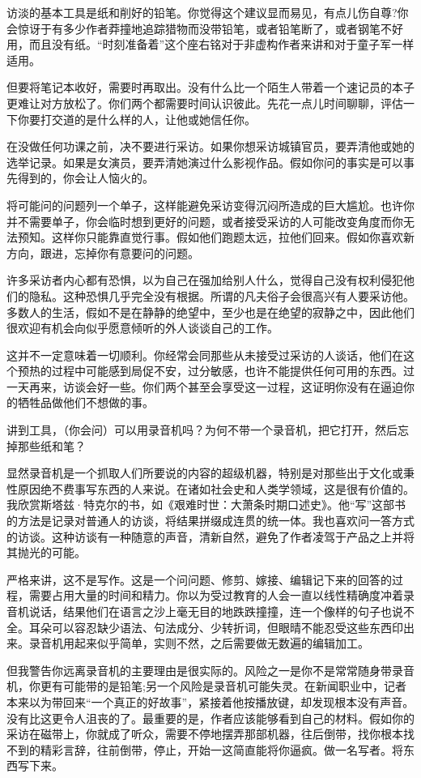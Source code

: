 访淡的基本工具是纸和削好的铅笔。你觉得这个建议显而易见，有点儿伤自尊?你会惊讶于有多少作者莽撞地追踪猎物而没带铅笔，或者铅笔断了，或者钢笔不好用，而且没有纸。“时刻准备着”这个座右铭对于非虚构作者来讲和对于童子军一样适用。

但要将笔记本收好，需要时再取出。没有什么比一个陌生人带着一个速记员的本子更难让对方放松了。你们两个都需要时间认识彼此。先花一点儿时间聊聊，评估一下你要打交道的是什么样的人，让他或她信任你。

在没做任何功课之前，决不要进行采访。如果你想采访城镇官员，要弄清他或她的选举记录。如果是女演员，要弄清她演过什么影视作品。假如你问的事实是可以事先得到的，你会让人恼火的。

将可能问的问题列一个单子，这样能避免采访变得沉闷所造成的巨大尴尬。也许你并不需要单子，你会临时想到更好的问题，或者接受采访的人可能改变角度而你无法预知。这样你只能靠直觉行事。假如他们跑题太远，拉他们回来。假如你喜欢新方向，跟进，忘掉你有意要问的问题。

许多采访者内心都有恐惧，以为自己在强加给别人什么，觉得自己没有权利侵犯他们的隐私。这种恐惧几乎完全没有根据。所谓的凡夫俗子会很高兴有人要采访他。多数人的生活，假如不是在静静的绝望中，至少也是在绝望的寂静之中，因此他们很欢迎有机会向似乎愿意倾听的外人谈谈自己的工作。

这并不一定意味着一切顺利。你经常会同那些从未接受过采访的人谈话，他们在这个预热的过程中可能感到局促不安，过分敏感，也许不能提供任何可用的东西。过一天再来，访谈会好一些。你们两个甚至会享受这一过程，这证明你没有在逼迫你的牺牲品做他们不想做的事。

讲到工具，（你会问）可以用录音机吗？为何不带一个录音机，把它打开，然后忘掉那些纸和笔？

显然录音机是一个抓取人们所要说的内容的超级机器，特别是对那些出于文化或秉性原因绝不费事写东西的人来说。在诸如社会史和人类学领域，这是很有价值的。我欣赏斯塔兹·特克尔的书，如《艰难时世：大萧条时期口述史》。他“写”这部书的方法是记录对普通人的访谈，将结果拼缀成连贯的统一体。我也喜欢问一答方式的访谈。这种访谈有一种随意的声音，清新自然，避免了作者凌驾于产品之上并将其抛光的可能。

严格来讲，这不是写作。这是一个问问题、修剪、嫁接、编辑记下来的回答的过程，需要占用大量的时间和精力。你以为受过教育的人会一直以线性精确度冲着录音机说话，结果他们在语言之沙上毫无目的地跌跌撞撞，连一个像样的句子也说不全。耳朵可以容忍缺少语法、句法成分、少转折词，但眼晴不能忍受这些东西印出来。录音机用起来似乎简单，实则不然，之后需要做无数遍的编辑加工。

但我警告你远离录音机的主要理由是很实际的。风险之一是你不是常常随身带录音机，你更有可能带的是铅笔;另一个风险是录音机可能失灵。在新闻职业中，记者本来以为带回来“一个真正的好故事”，紧接着他按播放键，却发现根本没有声音。没有比这更令人沮丧的了。最重要的是，作者应该能够看到自己的材料。假如你的采访在磁带上，你就成了听众，需要不停地摆弄那部机器，往后倒带，找你根本找不到的精彩言辞，往前倒带，停止，开始一这简直能将你逼疯。做一名写者。将东西写下来。

